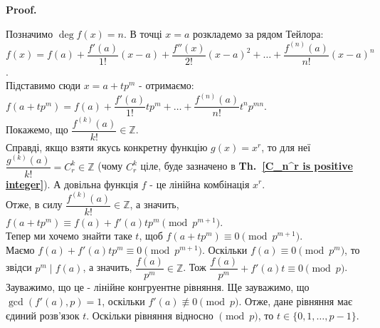 \documentclass[a4paper, 10pt]{article}
\makeatletter
\theoremstyle{theoremdd}
\theoremstyle{theoremdd}
\theoremstyle{theoremdd}
\theoremstyle{theoremdd}
\theoremstyle{theoremdd}
\newtheorem{proposition}[theorem]{Proposition}
\theoremstyle{theoremdd}
\theoremstyle{theoremdd}
\theoremstyle{theoremdd}
\renewenvironment{proof}[1][Proof.\\]{\par
\pushQED{\hfill \qed}%
\normalfont \topsep6\p@\@plus6\p@\relax
\trivlist
\item\relax
{\bfseries
#1\@addpunct{.}}\hspace\labelsep\ignorespaces
}{%
\popQED\endtrivlist\@endpefalse
}
\newcommand\thref[1]{\textbf{Th.~\ref{#1}}}
\makeatother
\begin{document}
\begin{proof}
Позначимо $\deg f(x) = n$. В точці $x = a$ розкладемо за рядом Тейлора:\\
$f(x) = f(a) + \dfrac{f'(a)}{1!}(x-a) + \dfrac{f''(x)}{2!}(x-a)^2 + \dots + \dfrac{f^{(n)}(a)}{n!}(x-a)^n$.\\
Підставимо сюди $x = a+tp^m$ - отримаємо:\\
$f(a+tp^m) = f(a) + \dfrac{f'(a)}{1!}tp^m + \dots + \dfrac{f^{(n)}(a)}{n!}t^n p^{mn}$.\\
Покажемо, що $\dfrac{f^{(k)}(a)}{k!} \in \mathbb{Z}$. \\
Справді, якщо взяти якусь конкретну функцію $g(x) = x^r$, то для неї $\dfrac{g^{(k)}(a)}{k!} = C_r^k \in \mathbb{Z}$ (чому $C_r^k$ ціле, буде зазначено в \thref{C_n^r is positive integer}). А довільна функція $f$ - це лінійна комбінація $x^r$.\\
Отже, в силу $\dfrac{f^{(k)}(a)}{k!} \in \mathbb{Z}$, а значить, $f(a+tp^m) \equiv f(a)+f'(a)tp^m \pmod {p^{m+1}}$.\\
Тепер ми хочемо знайти таке $t$, щоб $f(a+tp^m) \equiv 0 \pmod {p^{m+1}}$.\\
Маємо $f(a) + f'(a)tp^m \equiv 0 \pmod {p^{m+1}}$. Оскільки $f(a) \equiv 0 \pmod {p^m}$, то звідси $p^m \mid f(a)$, а значить, $\dfrac{f(a)}{p^m} \in \mathbb{Z}$. Тож $\dfrac{f(a)}{p^m} + f'(a)t \equiv 0 \pmod p$.\\
Зауважимо, що це - лінійне конгруентне рівняння. Ще зауважимо, що $\gcd(f'(a),p) = 1$, оскільки $f'(a) \not\equiv 0 \pmod {p}$. Отже, дане рівняння має єдиний розв'язок $t$. Оскільки рівняння відносно $\pmod p$, то $t \in \{0,1,\dots,p-1\}$.
\end{proof}

\end{document}
